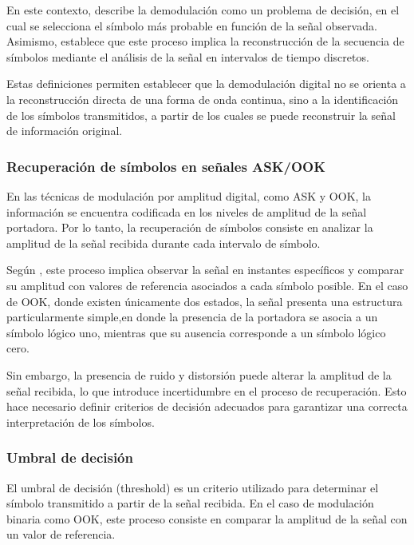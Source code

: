 En este contexto, \cite{proakis2007digital} describe la demodulación como un problema de decisión, en el cual se selecciona el símbolo más probable en función de la señal observada. Asimismo, \cite{haykin2001} establece que este proceso implica la reconstrucción de la secuencia de símbolos mediante el análisis de la señal en intervalos de tiempo discretos.

Estas definiciones permiten establecer que la demodulación digital no se orienta a la reconstrucción directa de una forma de onda continua, sino a la identificación de los símbolos transmitidos, a partir de los cuales se puede reconstruir la señal de información original.

\subsubsection{Recuperación de símbolos en señales ASK/OOK}

En las técnicas de modulación por amplitud digital, como ASK y OOK, la información se encuentra codificada en los niveles de amplitud de la señal portadora. Por lo tanto, la recuperación de símbolos consiste en analizar la amplitud de la señal recibida durante cada intervalo de símbolo.

Según \cite{lathi2009modern}, este proceso implica observar la señal en instantes específicos y comparar su amplitud con valores de referencia asociados a cada símbolo posible. En el caso de OOK, donde existen únicamente dos estados, la señal presenta una estructura particularmente simple,en donde la presencia de la portadora se asocia a un símbolo lógico uno, mientras que su ausencia corresponde a un símbolo lógico cero. 

Sin embargo, la presencia de ruido y distorsión puede alterar la amplitud de la señal recibida, lo que introduce incertidumbre en el proceso de recuperación. Esto hace necesario definir criterios de decisión adecuados para garantizar una correcta interpretación de los símbolos.

\subsubsection{Umbral de decisión}

El umbral de decisión (threshold) es un criterio utilizado para determinar el símbolo transmitido a partir de la señal recibida. En el caso de modulación binaria como OOK, este proceso consiste en comparar la amplitud de la señal con un valor de referencia.

